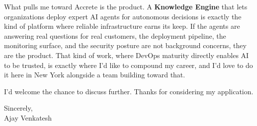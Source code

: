 \documentclass[letterpaper,11pt]{article}
\begin{document}
What pulls me toward Accrete is the product. A \textbf{Knowledge Engine} that lets organizations deploy expert AI agents for autonomous decisions is exactly the kind of platform where reliable infrastructure earns its keep. If the agents are answering real questions for real customers, the deployment pipeline, the monitoring surface, and the security posture are not background concerns, they are the product. That kind of work, where DevOps maturity directly enables AI to be trusted, is exactly where I'd like to compound my career, and I'd love to do it here in New York alongside a team building toward that.

I'd welcome the chance to discuss further. Thanks for considering my application.

\vspace{12pt}
Sincerely, \\
Ajay Venkatesh
\end{document}
